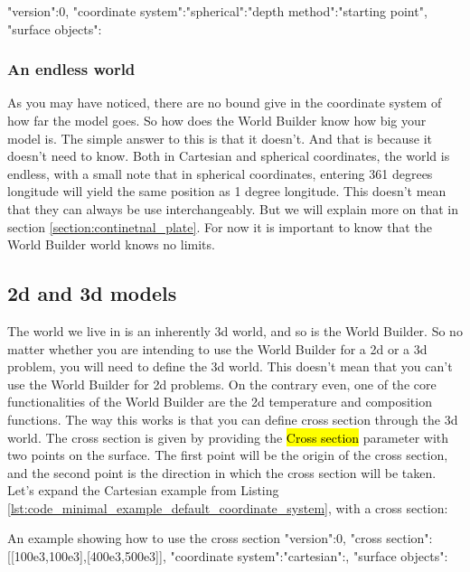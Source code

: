 \documentclass{book}
\newcommand{\WB}{{World Builder}}
\begin{document}
\begin{bashcode}{}
"version":0,
"coordinate system":{"spherical":{"depth method":"starting point"}},
"surface objects":{}
\end{bashcode}


\subsubsection{An endless world}
As you may have noticed, there are no bound give in the coordinate system of how far the model goes. So how does the \WB{} know how big your model is. The simple answer to this is that it doesn't. And that is because it doesn't need to know. Both in Cartesian and spherical coordinates, the world is endless, with a small note that in spherical coordinates, entering 361 degrees longitude will yield the same position as 1 degree longitude. This doesn't mean that they can always be use interchangeably. But we will explain more on that in section \ref{section:continetnal_plate}. For now it is important to know that the \WB{} world knows no limits.

\subsection{2d and 3d models}
The world we live in is an inherently 3d world, and so is the \WB{}. So no matter whether you are intending to use the \WB{} for a 2d or a 3d problem, you will need to define the 3d world. This doesn't mean that you can't use the \WB{} for 2d problems. On the contrary even, one of the core functionalities of the \WB{} are the 2d temperature and composition functions. The way this works is that you can define cross section through the 3d world. The cross section is given by providing the \hl{Cross section} parameter with two points on the surface. The first point will be the origin of the cross section, and the second point is the direction in which the cross section will be taken. Let's expand the Cartesian example from Listing \ref{lst:code_minimal_example_default_coordinate_system}, with a cross section:

\begin{bashcode}{An example showing how to use the cross section}
"version":0,
"cross section":[[100e3,100e3],[400e3,500e3]],
"coordinate system":{"cartesian":{}},
"surface objects":{}
\end{bashcode}
\end{document}
